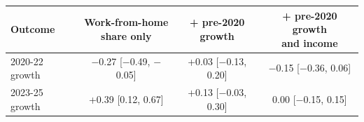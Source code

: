 \footnotesize\setlength{\tabcolsep}{4pt}
\begin{tabular}{lccc}
\toprule
Outcome & \shortstack[r]{Work-from-home\\share only} & \shortstack[r]{+ pre-2020\\growth} & \shortstack[r]{+ pre-2020 growth\\and income} \\
\midrule
2020-22 growth & $-$0.27 [$-$0.49, $-$0.05] & +0.03 [$-$0.13, 0.20] & $-$0.15 [$-$0.36, 0.06] \\
2023-25 growth & +0.39 [0.12, 0.67] & +0.13 [$-$0.03, 0.30] & 0.00 [$-$0.15, 0.15] \\
\bottomrule
\end{tabular}
